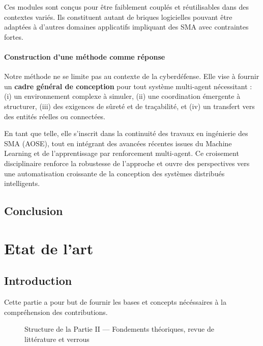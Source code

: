 \documentclass[ twoside,openright,titlepage,numbers=noenddot,headinclude,%
                footinclude=true,cleardoublepage=empty,abstractoff, %
                BCOR=5mm,paper=a4,fontsize=11pt,%
                french,american,%
                ]{scrreprt}
\begin{document}
Ces modules sont conçus pour être faiblement couplés et réutilisables dans des contextes variés. Ils constituent autant de briques logicielles pouvant être adaptées à d'autres domaines applicatifs impliquant des SMA avec contraintes fortes.



\subsection{Construction d'une méthode comme réponse}

Notre méthode ne se limite pas au contexte de la cyberdéfense. Elle vise à fournir un \textbf{cadre général de conception} pour tout système multi-agent nécessitant : (i) un environnement complexe à simuler, (ii) une coordination émergente à structurer, (iii) des exigences de sûreté et de traçabilité, et (iv) un transfert vers des entités réelles ou connectées.

En tant que telle, elle s'inscrit dans la continuité des travaux en ingénierie des SMA (AOSE), tout en intégrant des avancées récentes issues du Machine Learning et de l'apprentissage par renforcement multi-agent. Ce croisement disciplinaire renforce la robustesse de l'approche et ouvre des perspectives vers une automatisation croissante de la conception des systèmes distribués intelligents.


\chapter*{Conclusion}



\part{Etat de l'art}

\chapter*{Introduction}
Cette partie a pour but de fournir les bases et concepts nécéssaires à la compréhension des contributions.

\begin{figure}[h!]
    \centering
    
    \caption{Structure de la Partie II — Fondements théoriques, revue de littérature et verrous}
\end{figure}
\end{document}
